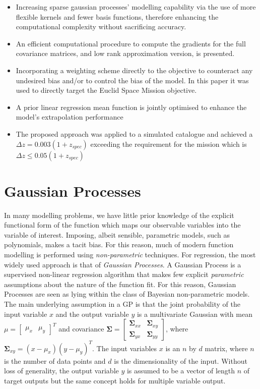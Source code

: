 \documentclass[useAMS,usenatbib,fleqn]{mn2e}
\newcommand{\bm}[1]{\mathbf{#1} }
\begin{document}
\begin{itemize}
  \item Increasing sparse gaussian processes' modelling capability via the use of more flexible kernels and fewer basis functions, therefore enhancing the computational complexity without sacrificing accuracy.
  \item An efficient computational procedure to compute the gradients for the full covariance matrices, and low rank approximation version, is presented.
  \item Incorporating a weighting scheme directly to the objective to counteract any undesired bias and/or to control the bias of the model. In this paper it was used to directly target the Euclid Space Mission objective.
  \item A prior linear regression mean function is jointly optimised to enhance the model's extrapolation performance
  \item The proposed approach was applied to a simulated catalogue and achieved  a $\Delta z = 0.003(1+z_{spec})$ exceeding the requirement for the mission which is $\Delta z \le 0.05(1+z_{spec})$
\end{itemize}

\section{Gaussian Processes}
\label{sec-gaussian-process}
In many modelling problems, we have little prior knowledge of the explicit functional form of the function which maps our observable variables into the variable of interest. Imposing, albeit sensible, parametric models, such as polynomials, makes a tacit bias. For this reason, much of modern function modelling is performed using \emph{non-parametric} techniques. For regression, the most widely used approach is that of \emph{Gaussian Processes}.
A Gaussian Process is a supervised non-linear regression algorithm that makes few explicit \emph{parametric} assumptions about the nature of the function fit. For this reason, Gaussian Processes are seen as lying within the class of Bayesian non-parametric models. The main underlying assumption in a GP is that the joint probability of the input variable $x$ and the output variable $y$ is a multivariate Gaussian with mean $\mu=\begin{bmatrix} \mu_{x} & \mu_{y}\end{bmatrix}^{T}$ and covariance $\bm{\Sigma}=\begin{bmatrix}\bm{\Sigma}_{xx} & \bm{\Sigma}_{xy}\\\bm{\Sigma}_{yx} & \bm{\Sigma}_{yy} \end{bmatrix}$, where $\bm{\Sigma}_{xy}=(x-\mu_{x})(y-\mu_{y})^{T}$. The input variables $x$ is an $n$ by $d$ matrix, where $n$ is the number of data points and $d$ is the dimensionality of the input. Without loss of generality, the output variable $y$ is assumed to be a vector of length $n$ of target outputs but the same concept holds for multiple variable output.
\end{document}
